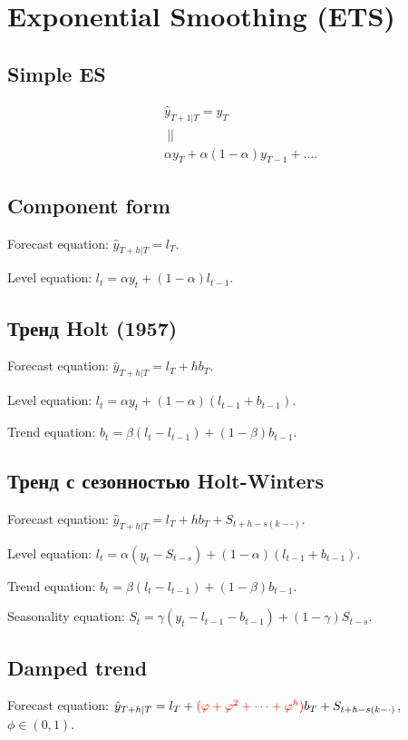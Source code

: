 \section{Exponential Smoothing (ETS)}
    \subsection{Simple ES}
        \begin{align*}
            & \hat y_{T+1\vert T} = y_T\\
            &\ || \\
            & \alpha y_T + \alpha(1-\alpha)y_{T-1} + \dots.
        \end{align*}
    \subsection{Component form}
        \noindent Forecast equation: $\hat y_{T+h\vert T} = l_T$.

        \noindent Level equation: $l_t = \alpha y_t + (1-\alpha)l_{t-1}$.

    \subsection{Тренд Holt (1957)}
        \noindent Forecast equation: $\hat y_{T+h\vert T} = l_T + hb_T$.

        \noindent Level equation: $l_t = \alpha y_t + (1-\alpha)(l_{t-1}+b_{t-1})$.

        \noindent Trend equation: $b_t = \beta(l_t - l_{t-1}) + (1-\beta) b_{t-1}$.

    \subsection{Тренд с сезонностью Holt-Winters}
        \noindent Forecast equation: $\hat y_{T+h\vert T} = l_T + hb_T + S_{t+h - s(k-\cdot)}$.

        \noindent Level equation: $l_t = \alpha (y_t - S_{t-s}) + (1-\alpha)(l_{t-1}+b_{t-1})$.

        \noindent Trend equation: $b_t = \beta(l_t - l_{t-1}) + (1-\beta) b_{t-1}$.

        \noindent Seasonality equation: $S_t = \gamma(y_t - l_{t-1} - b_{t-1}) + (1-\gamma) S_{t-s}$.

    \subsection{Damped trend}
        \noindent Forecast equation: $\hat y_{T+h\vert T} = l_T + {\color{red}(\phi + \phi^2 + \dots + \phi^h)}b_T + S_{t+h - s(k-\cdot)}$, $\phi \in (0, 1)$.

